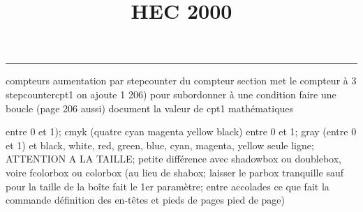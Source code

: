 \documentclass[11pt]{article}%
\title{\bf \vspace{-1cm} HEC 2000} %
\author{} %
\date{} %
\renewcommand{\headrulewidth}{0pt}%
\renewcommand{\footrulewidth}{0.4pt}%
\begin{document}
\maketitle %
\vspace{-1.2cm}\hrule %
\thispagestyle{fancy}

\vspace*{.4cm}


compteurs%
aumentation par stepcounter du compteur section%
met le compteur à 3%
stepcounter{cpt1} on ajoute 1%
206) pour subordonner à une condition %
faire une boucle (page 206 aussi) %
document la valeur de cpt1 
mathématiques\newcommand{\ch}{\operatorname{ch}} 
\newcommand{\sh}{\operatorname{sh}}
\renewcommand{\tanh}{\operatorname{th}}
\renewcommand{\sinh}{\operatorname{sh}}
\renewcommand{\cosh}{\operatorname{ch}}
\newcommand{\argsh}{\operatorname{argsh}}
\newcommand{\argch}{\operatorname{argch}}
\newcommand{\argth}{\operatorname{argth}}
\newcommand{\Id}{\operatorname{Id}}
\renewcommand{\leq}{\leq}
\renewcommand{\geq}{\geq }

\newcommand{\dlim}{\lim}
\newcommand{\dsum}{\sum}
\newcommand{\dprod}{\prod}



entre 0 et 1); cmyk (quatre cyan magenta yellow black) entre 0 et 1;
gray (entre 0 et 1) et black, white, red, green, blue, cyan, magenta,
yellow%
seule ligne; ATTENTION A LA TAILLE; petite différence avec shadowbox ou
doublebox, voire fcolorbox ou colorbox (au lieu de shabox; laisser le
parbox tranquille sauf pour la taille de la boîte
\newcommand{\Tbox}[1]{\begin{center} \shabox{\parbox{0.6
\linewidth}{#1}} \end{center}} %
fait le 1er paramètre; entre accolades ce que fait la commande
définition des en-têtes et pieds de pages\pagestyle{fancy}
\chead{}
\rfoot[ \ \thepage]{\thepage}
\cfoot{}
\lfoot{}
\thispagestyle{fancy} %
pied de page)\renewcommand{\footrulewidth}{0.4pt}
\renewcommand{\headrulewidth}{0.4pt}
\end{document}
